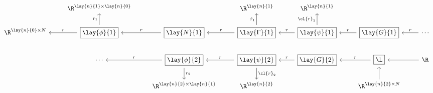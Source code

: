 {\tiny
\begin{equation*}
	\begin{tikzcd}
		{}
		&\R^{\lay{n}{1}\times\lay{n}{0}}
		&{}
		&\R^{\lay{n}{1}}
		&\R^{\lay{n}{1}}
		&{}
		\\
		\R^{\lay{n}{0}\times N}
		&\boxed{\lay{\phi}{1}}
		\arrow[l, swap, "r"]
		\arrow[u, "r_1"]
		&\boxed{\lay{N}{1}}
		\arrow[l, swap, "r"]
		&\boxed{\lay{\Gamma}{1}}
		\arrow[l, swap, "r"]
		\arrow[u, "\hat{r}_1"]
		&\boxed{\lay{\psi}{1}}
		\arrow[l, swap, "r"]
		\arrow[u, "\cl{r}_1"]
		&\boxed{\lay{G}{1}}
		\arrow[l, swap, "r"]
		&\cdots
		\arrow[l, swap, "r"]
		\\
		{}
		&\cdots
		&\boxed{\lay{\phi}{2}}
		\arrow[l, swap, "r"]
		\arrow[d, "r_2"]
		&\boxed{\lay{\psi}{2}}
		\arrow[l, swap, "r"]
		\arrow[d, "\cl{r}_2"]
		&\boxed{\lay{G}{2}}
		\arrow[l, swap, "r"]
		&\boxed{\L}
		\arrow[l, swap, "r"]
		&\R
		\arrow[l]
		\\
		{}
		&{}
		&\R^{\lay{n}{2}\times\lay{n}{1}}
		&\R^{\lay{n}{2}}
		&{}
		&\R^{\lay{n}{2}\times N}
		\arrow[u]
		&{}
	\end{tikzcd}
\end{equation*}
}

